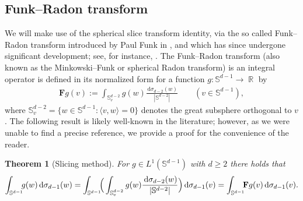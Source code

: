 \documentclass[12pt, reqno]{amsart}%
\theoremstyle{plain}  %
\newtheorem{theorem}{Theorem}[section]
\theoremstyle{definition}  %
\theoremstyle{remark}
\numberwithin{equation}{section}
\DeclareMathOperator{\R}{\mathbb{R}}
\renewcommand{\d}{\,\mathrm{d}}
\begin{document}
\subsection{Funk--Radon transform} 
We will make use of the spherical slice transform identity, via  the so called Funk--Radon transform introduced by Paul Funk in \cite{Fun11,Fun13}, and which has since undergone significant development; see, for instance, \cite{Rub15,Que20,Que20-bis}. The Funk--Radon transform (also known as the Minkowski–Funk or spherical Radon transform) is an integral operator is defined  in its normalized form for a function $g : \mathbb{S}^{d-1} \to \R$ by
\begin{align*}
\mathbf{F}g(v) := \int_{\mathbb{S}^{d-2}_v} g(w) \frac{\d\sigma_{d-2}(w)}{|\mathbb{S}^{d-2}|} \qquad (v\in \mathbb{S}^{d-1}),
\end{align*}
where $\mathbb{S}^{d-2}_v = \{ w \in \mathbb{S}^{d-1} : \langle v, w \rangle = 0 \}$ denotes the great subsphere orthogonal to $v$.
The following result is likely well-known in the literature; however, as we were unable to find a precise reference, we provide a proof for the convenience of the reader.
\begin{theorem}[Slicing method]
\label{thm:slicing-integ-on-sphere}
For $g \in L^1( \mathbb{S}^{d-1})$ with $d \geq 2$ there holds that
\begin{align*}
\int_{\mathbb{S}^{d-1}} \hspace*{-1ex}g(w) \d\sigma_{d-1}(w)
=
\int_{\mathbb{S}^{d-1}} \hspace*{-1ex}
\Big(
\int_{\mathbb{S}^{d-2}_v} g(w) \frac{\d\sigma_{d-2}(w)}{|\mathbb{S}^{d-2}|}
\Big)
\d\sigma_{d-1}(v)= \int_{\mathbb{S}^{d-1}}\hspace*{-1ex} \mathbf{F}g(v) \d\sigma_{d-1}(v).
\end{align*}
\end{theorem}
\end{document}
